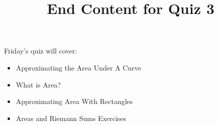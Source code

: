 \documentclass{ximera}
\title{End Content for Quiz 3}
\begin{document}
\begin{abstract}
\end{abstract}

\maketitle

\begin{sectionOutcomes}

Friday's quiz will cover:




\begin{itemize}
\item Approximating the Area Under A Curve
\item What is Area?
\item Approximating Area With Rectangles
\item Areas and Riemann Sums Exercises
\end{itemize}

\end{sectionOutcomes}
\end{document}
